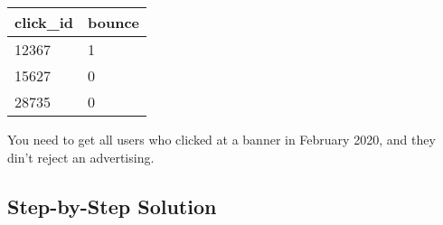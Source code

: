 \documentclass[14pt, a4paper]{extarticle}
\begin{document}
\begin{table}[h]
	\begin{tabular}{|l|l|}
		\hline
		click\_id & bounce	\\ \hline
		12367 	  & 1       \\ \hline
		15627 	  & 0       \\ \hline
		28735     & 0		\\ \hline	
	\end{tabular}
\end{table}

\noindent
You need to get all users who clicked at a banner in February 2020, and 
they din't reject an advertising.

\subsection*{Step-by-Step Solution}
\end{document}
